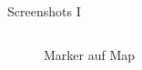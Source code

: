 \documentclass{beamer}
\begin{document}
\begin{frame}{Screenshots I}
\begin{columns}[onlytextwidth]
			\begin{column}{0.5\textwidth}
				\centering
				\begin{figure}
					\caption{Marker auf Map}
				\end{figure}
			\end{column}
		
		\end{columns}
	\end{frame}
\end{document}
